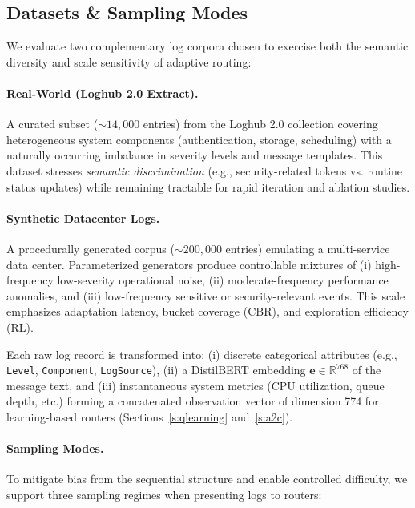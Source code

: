 \subsection{Datasets \& Sampling Modes}
\label{s:datasets-sampling}

We evaluate two complementary log corpora chosen to exercise both the semantic diversity and scale sensitivity of adaptive routing:

\paragraph{Real-World (Loghub 2.0 Extract).} A curated subset (\(\sim 14{,}000\) entries) from the Loghub 2.0 collection covering heterogeneous system components (authentication, storage, scheduling) with a naturally occurring imbalance in severity levels and message templates. This dataset stresses \emph{semantic discrimination} (e.g., security-related tokens vs. routine status updates) while remaining tractable for rapid iteration and ablation studies.

\paragraph{Synthetic Datacenter Logs.} A procedurally generated corpus (\(\sim 200{,}000\) entries) emulating a multi-service data center. Parameterized generators produce controllable mixtures of (i) high-frequency low-severity operational noise, (ii) moderate-frequency performance anomalies, and (iii) low-frequency sensitive or security-relevant events. This scale emphasizes adaptation latency, bucket coverage (CBR), and exploration efficiency (RL).

\medskip
Each raw log record is transformed into: (i) discrete categorical attributes (e.g., \texttt{Level}, \texttt{Component}, \texttt{LogSource}), (ii) a DistilBERT embedding \(\mathbf{e} \in \mathbb{R}^{768}\) of the message text, and (iii) instantaneous system metrics (CPU utilization, queue depth, etc.) forming a concatenated observation vector of dimension 774 for learning-based routers (Sections~\ref{s:qlearning} and~\ref{s:a2c}).

\paragraph{Sampling Modes.} To mitigate bias from the sequential structure and enable controlled difficulty, we support three sampling regimes when presenting logs to routers:

